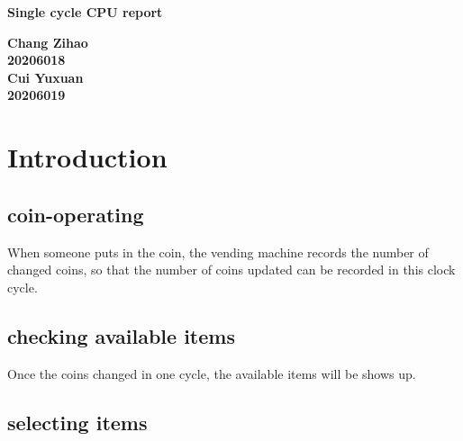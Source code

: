 \documentclass[12pt,a4paper]{article}
\begin{document}
\begin{titlepage}
  \begin{center}
    \vspace*{1cm}

    \textbf{\Huge Single cycle CPU  report}

    \vspace{0.5cm}

         
    \vspace{1.5cm}

    \textbf{\large Chang Zihao \\20206018\\\large Cui Yuxuan\\20206019}

    \vfill
         

         
    \vspace{0.8cm}
  


         
\end{center}
\end{titlepage}


\newpage
\tableofcontents
\thispagestyle{empty}

\newpage
{}
\setcounter{page}{1}

\section{Introduction}






\subsection{coin-operating}

When someone puts in the coin, the vending machine records the number of changed coins, so that the number of coins updated can be recorded in this clock cycle.

\subsection{checking available items}

Once the coins changed in one cycle, the available items will be shows up.

\subsection{selecting items}
\end{document}
